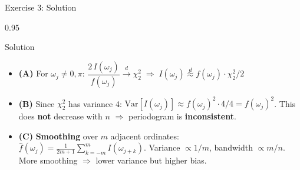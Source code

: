 \documentclass[9pt, aspectratio=169, t]{beamer}
\begin{document}
\begin{frame}{Exercise 3: Solution}
    \begin{cminipage}{0.95\textwidth}
    \begin{exampleblock}{Solution}
        {\footnotesize
        \begin{itemize}\setlength{\itemsep}{3pt}
            \item \textcolor{MainBlue}{\textbf{(A)}} For $\omega_j \neq 0, \pi$:
                $\dfrac{2\,I(\omega_j)}{f(\omega_j)} \xrightarrow{d} \chi^2_2 \;\Rightarrow\; I(\omega_j) \stackrel{d}{\approx} f(\omega_j)\cdot\chi^2_2/2$
            \item \textcolor{MainBlue}{\textbf{(B)}} Since $\chi^2_2$ has variance 4: $\text{Var}[I(\omega_j)] \approx f(\omega_j)^2 \cdot 4/4 = f(\omega_j)^2$. This does \textbf{not} decrease with $n$ $\Rightarrow$ periodogram is \textbf{inconsistent}.
            \item \textcolor{MainBlue}{\textbf{(C)}} \textbf{Smoothing} over $m$ adjacent ordinates:
                $\hat{f}(\omega_j) = \frac{1}{2m+1}\sum_{k=-m}^{m} I(\omega_{j+k})$.
                Variance $\propto 1/m$, bandwidth $\propto m/n$. More smoothing $\Rightarrow$ lower variance but higher bias.
        \end{itemize}
        }
    \end{exampleblock}
    \end{cminipage}
\end{frame}
\end{document}
